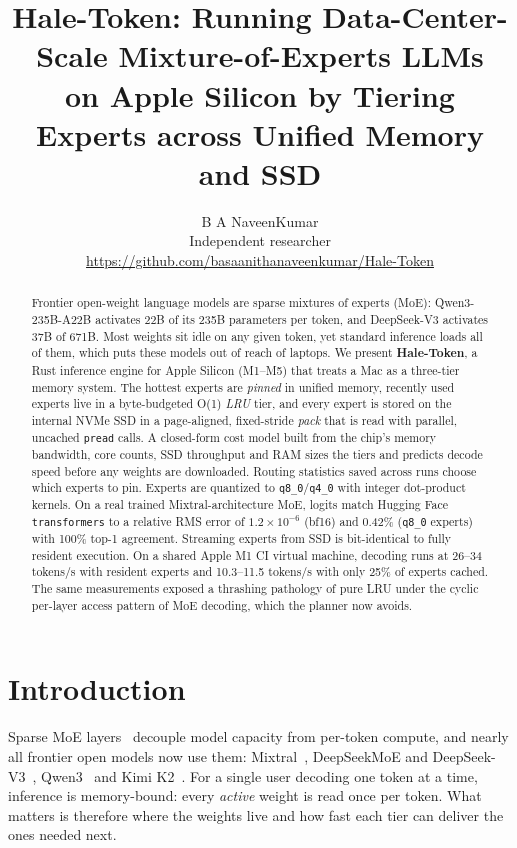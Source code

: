 \documentclass[11pt]{article}
\title{\textbf{Hale-Token: Running Data-Center-Scale Mixture-of-Experts LLMs\\on Apple Silicon by Tiering Experts across Unified Memory and SSD}}
\author{B A NaveenKumar\\
\small Independent researcher\\
\small \url{https://github.com/basaanithanaveenkumar/Hale-Token}}
\date{}
\begin{document}
\maketitle

\begin{abstract}
Frontier open-weight language models are sparse mixtures of experts (MoE): Qwen3-235B-A22B
activates 22B of its 235B parameters per token, and DeepSeek-V3 activates 37B of 671B. Most
weights sit idle on any given token, yet standard inference loads all of them, which puts
these models out of reach of laptops. We present \textbf{Hale-Token}, a Rust inference
engine for Apple Silicon (M1--M5) that treats a Mac as a three-tier memory system. The
hottest experts are \emph{pinned} in unified memory, recently used experts live in a
byte-budgeted O(1) \emph{LRU} tier, and every expert is stored on the internal NVMe SSD in a
page-aligned, fixed-stride \emph{pack} that is read with parallel, uncached \texttt{pread}
calls. A closed-form cost model built from the chip's memory bandwidth, core counts, SSD
throughput and RAM sizes the tiers and predicts decode speed before any weights are
downloaded. Routing statistics saved across runs choose which experts to pin. Experts are
quantized to \texttt{q8\_0}/\texttt{q4\_0} with integer dot-product kernels. On a real trained
Mixtral-architecture MoE, logits match Hugging Face \texttt{transformers} to a relative RMS
error of $1.2\times10^{-6}$ (bf16) and 0.42\% (\texttt{q8\_0} experts) with 100\% top-1
agreement. Streaming experts from SSD is bit-identical to fully resident execution. On a
shared Apple M1 CI virtual machine, decoding runs at 26--34 tokens/s with resident experts and
10.3--11.5 tokens/s with only 25\% of experts cached. The same measurements exposed a
thrashing pathology of pure LRU under the cyclic per-layer access pattern of MoE decoding,
which the planner now avoids.
\end{abstract}

\section{Introduction}

Sparse MoE layers~\cite{shazeer2017outrageously,fedus2022switch} decouple model capacity from
per-token compute, and nearly all frontier open models now use them:
Mixtral~\cite{jiang2024mixtral}, DeepSeekMoE and DeepSeek-V3~\cite{dai2024deepseekmoe,deepseekv3},
Qwen3~\cite{qwen3} and Kimi K2~\cite{kimik2}. For a single user decoding one token at a time,
inference is memory-bound: every \emph{active} weight is read once per token. What matters is
therefore where the weights live and how fast each tier can deliver the ones needed next.
\end{document}
